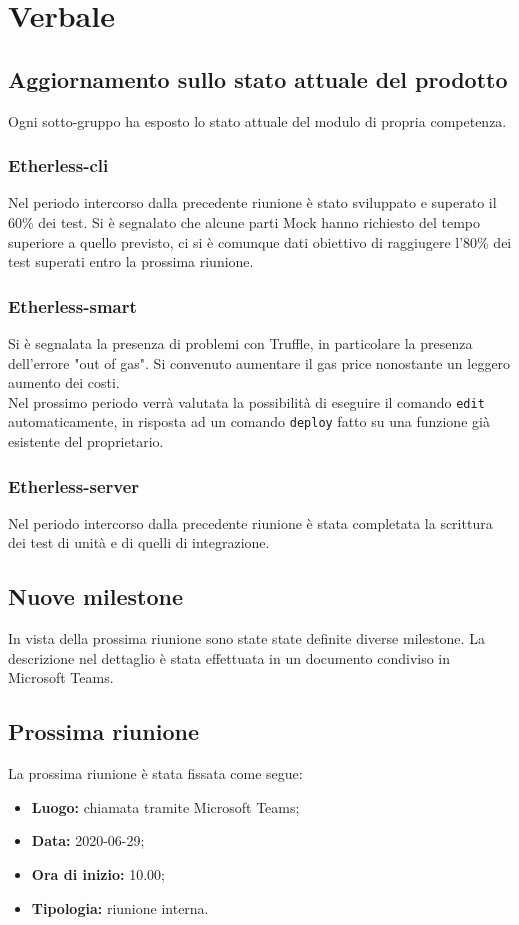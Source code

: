\section{Verbale}

	\subsection{Aggiornamento sullo stato attuale del prodotto}
		Ogni sotto-gruppo ha esposto lo stato attuale del modulo\textit{} di propria competenza.
		
		\subsubsection{Etherless-cli}
			Nel periodo intercorso dalla precedente riunione è stato sviluppato e superato il 60\% dei test. Si è segnalato che alcune parti Mock\textit{} hanno richiesto del tempo superiore a quello previsto, ci si è comunque dati obiettivo di raggiugere l'80\% dei test superati entro la prossima riunione.
			
		\subsubsection{Etherless-smart}
			Si è segnalata la presenza di problemi con Truffle\textit{}, in particolare la presenza dell'errore "out of gas". Si convenuto aumentare il gas price nonostante un leggero aumento dei costi. \\
			Nel prossimo periodo verrà valutata la possibilità di eseguire il comando \texttt{edit} automaticamente, in risposta ad un comando \texttt{deploy} fatto su una funzione già esistente del proprietario.
			
		\subsubsection{Etherless-server}
			Nel periodo intercorso dalla precedente riunione è stata completata la scrittura dei test di unità e di quelli di integrazione.
	
	\subsection{Nuove milestone}
		In vista della prossima riunione sono state state definite diverse milestone. La descrizione nel dettaglio è stata effettuata in un documento condiviso in Microsoft Teams.
				
	\subsection{Prossima riunione}
		La prossima riunione è stata fissata come segue:
		\begin{itemize}
			\item \textbf{Luogo:} chiamata tramite Microsoft Teams; 
			\item \textbf{Data:} 2020-06-29;
			\item \textbf{Ora di inizio:} 10.00;
			\item \textbf{Tipologia:} riunione interna.
		\end{itemize}